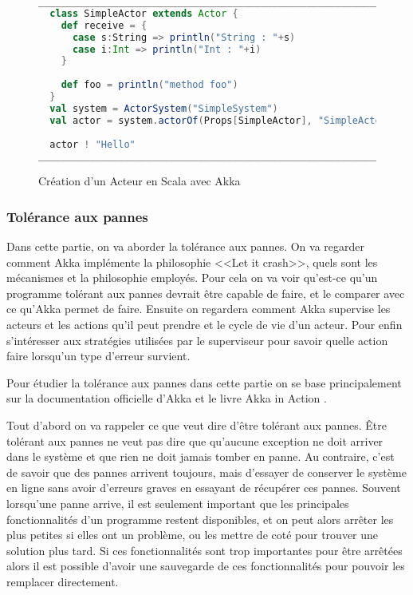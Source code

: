 \documentclass[11pt, a4paper]{article}
\begin{document}
\begin{figure}[ht]
\centering
\begin{lstlisting}[language=Scala]
__________________________________________________________________________
  class SimpleActor extends Actor {
    def receive = {
      case s:String => println("String : "+s)
      case i:Int => println("Int : "+i)
    }
    
    def foo = println("method foo")
  }
  val system = ActorSystem("SimpleSystem")
  val actor = system.actorOf(Props[SimpleActor], "SimpleActor")
  
  actor ! "Hello"
___________________________________________________________________________
\end{lstlisting}
\caption{Création d'un Acteur en Scala avec Akka}
\label{act_crea}
\end{figure}

\subsubsection{Tolérance aux pannes}
Dans cette partie, on va aborder la tolérance aux pannes. On va regarder comment Akka implémente la philosophie <<Let it crash>>, quels sont les mécanismes et la philosophie employés. Pour cela on va voir qu'est-ce qu'un programme tolérant aux pannes devrait être capable de faire, et le comparer avec ce qu'Akka permet de faire. Ensuite on regardera comment Akka supervise les acteurs et les actions qu'il peut prendre et le cycle de vie d'un acteur. Pour enfin s’intéresser aux stratégies utilisées par le superviseur pour savoir quelle action faire lorsqu'un type d'erreur survient.
\par Pour étudier la tolérance aux pannes dans cette partie on se base principalement sur la documentation officielle d'Akka \cite{akka} et le livre Akka in Action \cite{roestenburg2015akka}.

\par Tout d'abord on va rappeler ce que veut dire d'être tolérant aux pannes. Être tolérant aux pannes ne veut pas dire que qu'aucune exception ne doit arriver dans le système et que rien ne doit jamais tomber en panne. Au contraire, c'est de savoir que des pannes arrivent toujours, mais d'essayer de conserver le système en ligne sans avoir d'erreurs graves en essayant de récupérer ces pannes. Souvent lorsqu'une panne arrive, il est seulement important que les principales fonctionnalités d'un programme restent disponibles, et on peut alors arrêter les plus petites si elles ont un problème, ou les mettre de coté pour trouver une solution plus tard. Si ces fonctionnalités sont trop importantes pour être arrêtées alors il est possible d'avoir une sauvegarde de ces fonctionnalités pour pouvoir les remplacer directement.
\end{document}

